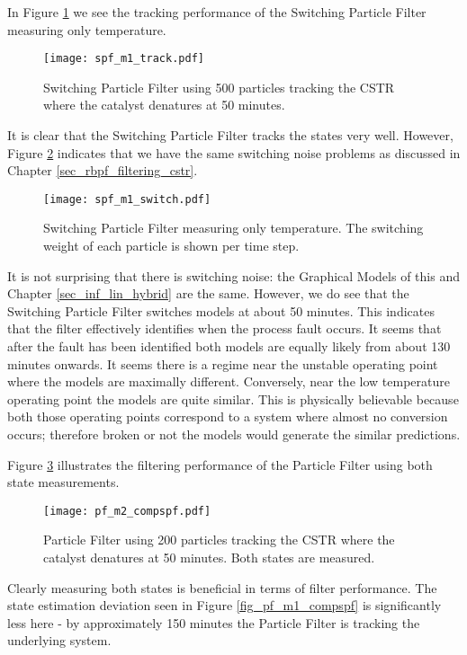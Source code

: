 In Figure \ref{fig_spf_m1_track} we see the tracking performance of the Switching Particle Filter measuring only temperature.
\begin{figure}[H] 
\centering
\texttt{[image: spf\_m1\_track.pdf]}
\caption{Switching Particle Filter using 500 particles tracking the CSTR where the catalyst denatures at 50 minutes.}
\label{fig_spf_m1_track}
\end{figure}
It is clear that the Switching Particle Filter tracks the states very well. However, Figure \ref{fig_spf_m1_switch} indicates that we have the same switching noise problems as discussed in Chapter \ref{sec_rbpf_filtering_cstr}.
\begin{figure}[H] 
\centering
\texttt{[image: spf\_m1\_switch.pdf]}
\caption{Switching Particle Filter measuring only temperature. The switching weight of each particle is shown per time step.}
\label{fig_spf_m1_switch}
\end{figure} 
It is not surprising that there is switching noise: the Graphical Models of this and Chapter \ref{sec_inf_lin_hybrid} are the same. However, we do see that the Switching Particle Filter switches models at about 50 minutes. This indicates that the filter effectively identifies when the process fault occurs. It seems that after the fault has been identified both models are equally likely from about 130 minutes onwards. It seems there is a regime near the unstable operating point where the models are maximally different. Conversely, near the low temperature operating point the models are quite similar. This is physically believable because both those operating points correspond to a system where almost no conversion occurs; therefore broken or not the models would generate the similar predictions.

Figure \ref{fig_pf_m2_compspf} illustrates the filtering performance of the Particle Filter using both state measurements.
\begin{figure}[H] 
\centering
\texttt{[image: pf\_m2\_compspf.pdf]}
\caption{Particle Filter using 200 particles tracking the CSTR where the catalyst denatures at 50 minutes. Both states are measured.}
\label{fig_pf_m2_compspf}
\end{figure}
Clearly measuring both states is beneficial in terms of filter performance. The state estimation deviation seen in Figure \ref{fig_pf_m1_compspf} is significantly less here - by approximately 150 minutes the Particle Filter is tracking the underlying system.

